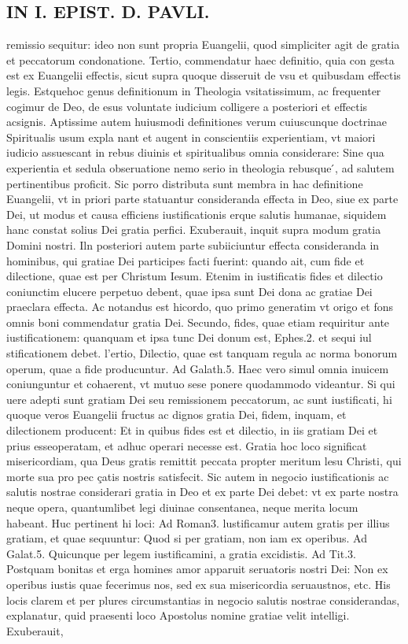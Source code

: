\documentclass{article}
\begin{document}
\begin{pages}
\section*{IN I. EPIST. D. PAVLI. }
\marginpar{[ p.45 ]}\pstart remissio sequitur: ideo non sunt propria Euangelii, quod simpliciter agit de gratia et peccatorum condonatione. Tertio, commendatur haec definitio, quia con gesta est ex Euangelii effectis, sicut supra quoque disseruit de vsu et quibusdam effectis legis. Estquehoc genus definitionum in Theologia vsitatissimum, ac frequenter cogimur de Deo, de esus voluntate iudicium colligere a posteriori et effectis acsignis. Aptissime autem huiusmodi definitiones verum cuiuscunque  doctrinae Spiritualis usum expla nant et augent in conscientiis experientiam, vt maiori iudicio assuescant in rebus diuinis et spiritualibus omnia considerare: Sine qua experientia et sedula obseruatione nemo serio in theologia rebusque ́, ad salutem pertinentibus proficit. Sic porro distributa sunt membra in hac definitione Euangelii, vt in priori parte statuantur consideranda effecta in Deo, siue ex parte Dei, ut modus et causa efficiens iustificationis erque  salutis humanae, siquidem hanc constat solius Dei gratia perfici.  \pend\pstart Exuberauit, inquit supra modum gratia Domini nostri. Iln posteriori autem parte subiiciuntur effecta consideranda in hominibus, qui gratiae Dei participes facti fuerint: quando ait, cum fide et dilectione, quae est per Christum Iesum. Etenim in iustificatis fides et dilectio coniunctim elucere perpetuo debent, quae ipsa sunt Dei dona ac gratiae Dei praeclara effecta. Ac notandus est hicordo, quo primo generatim vt origo et fons omnis boni commendatur gratia Dei. Secundo, fides, quae etiam requiritur ante iustificationem: quanquam et ipsa tunc Dei donum est, Ephes.2. et sequi iul stificationem debet. l’ertio, Dilectio, quae est tanquam regula ac norma bonorum operum, quae a fide producuntur. Ad Galath.5. Haec vero simul omnia inuicem coniunguntur et cohaerent, vt mutuo sese ponere quodammodo videantur. Si qui uere adepti sunt gratiam Dei seu remissionem peccatorum, ac sunt iustificati, hi quoque veros Euangelii fructus ac dignos gratia Dei, fidem, inquam, et dilectionem producent: Et in quibus fides est et dilectio, in iis gratiam Dei et prius esseoperatam, et adhuc operari necesse est. Gratia hoc loco significat misericordiam, qua Deus gratis remittit peccata propter meritum lesu Christi, qui morte sua pro pec çatis nostris satisfecit. Sic autem in negocio iustificationis ac salutis nostrae considerari gratia in Deo et ex parte Dei debet: vt ex parte nostra neque opera, quantumlibet legi diuinae consentanea, neque merita locum habeant. Huc pertinent hi loci: Ad Roman3. lustificamur autem gratis per illius gratiam, et quae sequuntur: Quod si per gratiam, non iam ex operibus. Ad Galat.5. Quicunque  per legem iustificamini, a gratia excidistis. Ad Tit.3. Postquam bonitas et erga homines amor apparuit seruatoris nostri Dei: Non ex operibus iustis quae fecerimus nos, sed ex sua misericordia seruaustnos, etc. His locis clarem et per plures circumstantias in negocio salutis nostrae considerandas, explanatur, quid praesenti loco Apostolus nomine gratiae velit intelligi.  \pend\pstart Exuberauit, 
\end{pages}
\end{document}
